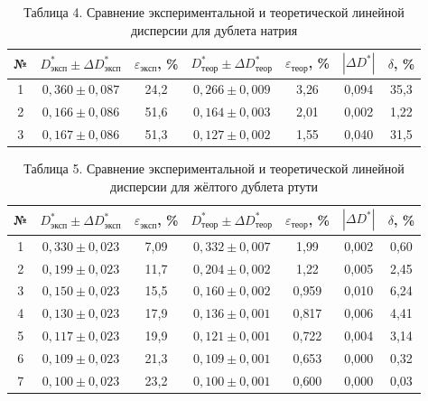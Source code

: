 \documentclass[a4paper]{article}
\begin{document}
\begin{enumerate}
\begin{table}[h!]
    \centering
    \begin{tabular}{|c|c|c|c|c|c|c|}
        \hline
        № & $D^*_{\text{эксп}} \pm \Delta D^*_{\text{эксп}}$ & $\varepsilon_{\text{эксп}}$, \% & $D^*_{\text{теор}} \pm \Delta D^*_{\text{теор}}$ & $\varepsilon_{\text{теор}}$, \% & $|\Delta D^*|$ & $\delta$, \% \\ \hline
        1 & $0{,}360 \pm 0{,}087$ & 24{,}2 & $0{,}266 \pm 0{,}009$ & 3{,}26 & 0{,}094 & 35{,}3 \\ \hline
        2 & $0{,}166 \pm 0{,}086$ & 51{,}6 & $0{,}164 \pm 0{,}003$ & 2{,}01 & 0{,}002 & 1{,}22 \\ \hline
        3 & $0{,}167 \pm 0{,}086$ & 51{,}3 & $0{,}127 \pm 0{,}002$ & 1{,}55 & 0{,}040 & 31{,}5 \\ \hline
    \end{tabular}
    \caption{Таблица 4. Сравнение экспериментальной и теоретической линейной дисперсии для дублета натрия}
    \label{tab:dispersion_na}
\end{table}

\begin{table}[h!]
    \centering
    \begin{tabular}{|c|c|c|c|c|c|c|}
        \hline
        № & $D^*_{\text{эксп}} \pm \Delta D^*_{\text{эксп}}$ & $\varepsilon_{\text{эксп}}$, \% & $D^*_{\text{теор}} \pm \Delta D^*_{\text{теор}}$ & $\varepsilon_{\text{теор}}$, \% & $|\Delta D^*|$ & $\delta$, \% \\ \hline
        1 & $0{,}330 \pm 0{,}023$ & 7{,}09 & $0{,}332 \pm 0{,}007$ & 1{,}99 & 0{,}002 & 0{,}60 \\ \hline
        2 & $0{,}199 \pm 0{,}023$ & 11{,}7 & $0{,}204 \pm 0{,}002$ & 1{,}22 & 0{,}005 & 2{,}45 \\ \hline
        3 & $0{,}150 \pm 0{,}023$ & 15{,}5 & $0{,}160 \pm 0{,}002$ & 0{,}959 & 0{,}010 & 6{,}24 \\ \hline
        4 & $0{,}130 \pm 0{,}023$ & 17{,}9 & $0{,}136 \pm 0{,}001$ & 0{,}817 & 0{,}006 & 4{,}41 \\ \hline
        5 & $0{,}117 \pm 0{,}023$ & 19{,}9 & $0{,}121 \pm 0{,}001$ & 0{,}722 & 0{,}004 & 3{,}14 \\ \hline
        6 & $0{,}109 \pm 0{,}023$ & 21{,}3 & $0{,}109 \pm 0{,}001$ & 0{,}653 & 0{,}000 & 0{,}32 \\ \hline
        7 & $0{,}100 \pm 0{,}023$ & 23{,}2 & $0{,}100 \pm 0{,}001$ & 0{,}600 & 0{,}000 & 0{,}03 \\ \hline
    \end{tabular}
    \caption{Таблица 5. Сравнение экспериментальной и теоретической линейной дисперсии для жёлтого дублета ртути}
    \label{tab:dispersion_hg}
\end{table}


\end{enumerate}
\end{document}

